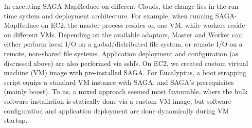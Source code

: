 \documentclass[conference,final]{IEEEtran}
\newcommand{\jhanote}[1]{ {\textcolor{red} { ***SJ: #1 }}}
\newcommand{\jhanote}[1]{}
\newcommand{\sagamapreduce }{SAGA-MapReduce }
\begin{document}
In executing \sagamapreduce on different Clouds, the change lies in
the run-time system and deployment architecture. For example, when
running \sagamapreduce on EC2, the master process resides on one VM,
while workers reside on different VMs.  Depending on the available
adaptors, Master and Worker can either perform local I/O on a
global/distributed file system, or remote I/O on a remote, non-shared
file systems.  %
Application deployment and configuration (as discussed above) are also
performed via sshfs.  On EC2, we created custom virtual machine
(VM) image with pre-installed SAGA.  For Eucalyptus, a boot strapping
script equips a standard VM instance with SAGA, and SAGA's
prerequisites (mainly boost).  To us, a mixed approach seemed most
favourable, where the bulk software installation is statically done
via a custom VM image, but software configuration and application
deployment are done dynamically during VM startup.




\end{document}
